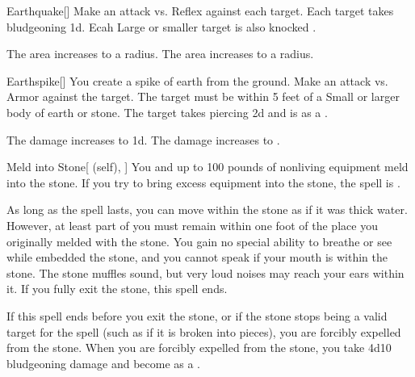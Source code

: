 \lowercase{\hypertarget{spell:Earthquake}{}}\label{spell:Earthquake}
\begin{freeability}[Rank 3]{\hypertarget{spell:Earthquake}{Earthquake}}[]
Make an attack vs. Reflex against each target.
\hit Each target takes bludgeoning  \minus1d.
Ecah Large or smaller target is also knocked .

\rankline
{} The area increases to a \arealarge radius.
 The area increases to a \areahuge radius.
\end{freeability}
\vspace{0.25em}



\lowercase{\hypertarget{spell:Earthspike}{}}\label{spell:Earthspike}
\begin{freeability}[Rank 3]{\hypertarget{spell:Earthspike}{Earthspike}}[]
You create a spike of earth from the ground.
Make an attack vs. Armor against the target.
The target must be within 5 feet of a Small or larger body of earth or stone.
\hit The target takes piercing  \minus2d and is  as a .

\rankline
{} The damage increases to  \minus1d.
 The damage increases to .
\end{freeability}
\vspace{0.25em}



\lowercase{\hypertarget{spell:Meld into Stone}{}}\label{spell:Meld into Stone}
\begin{attuneability}[Rank 3]{\hypertarget{spell:Meld into Stone}{Meld into Stone}}[ (self), ]
You and up to 100 pounds of nonliving equipment meld into the stone.
If you try to bring excess equipment into the stone, the spell is .

As long as the spell lasts, you can move within the stone as if it was thick water.
However, at least part of you must remain within one foot of the place you originally melded with the stone.
You gain no special ability to breathe or see while embedded the stone, and you cannot speak if your mouth is within the stone.
The stone muffles sound, but very loud noises may reach your ears within it.
If you fully exit the stone, this spell ends.

If this spell ends before you exit the stone, or if the stone stops being a valid target for the spell (such as if it is broken into pieces), you are forcibly expelled from the stone.
When you are forcibly expelled from the stone, you take 4d10 bludgeoning damage and become  as a .
\end{attuneability}
\vspace{0.25em}



